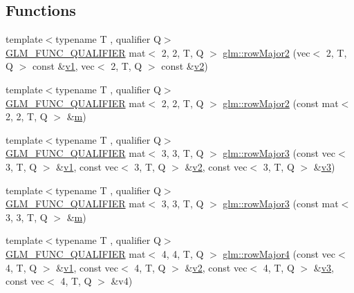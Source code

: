 \subsection*{Functions}
\begin{DoxyCompactItemize}
\item 
{\footnotesize template$<$typename T , qualifier Q$>$ }\\\hyperlink{setup_8hpp_a33fdea6f91c5f834105f7415e2a64407}{G\+L\+M\+\_\+\+F\+U\+N\+C\+\_\+\+Q\+U\+A\+L\+I\+F\+I\+ER} mat$<$ 2, 2, T, Q $>$ \hyperlink{group__gtx__matrix__major__storage_gaf5b1aee9e3eb1acf9d6c3c8be1e73bb8}{glm\+::row\+Major2} (vec$<$ 2, T, Q $>$ const \&\hyperlink{_s_d_l__opengl__glext_8h_a435c176a02c061b43e19bdf7c86cceae}{v1}, vec$<$ 2, T, Q $>$ const \&\hyperlink{_s_d_l__opengl__glext_8h_a0928f6d0f0f794ba000a21dfae422136}{v2})
\item 
{\footnotesize template$<$typename T , qualifier Q$>$ }\\\hyperlink{setup_8hpp_a33fdea6f91c5f834105f7415e2a64407}{G\+L\+M\+\_\+\+F\+U\+N\+C\+\_\+\+Q\+U\+A\+L\+I\+F\+I\+ER} mat$<$ 2, 2, T, Q $>$ \hyperlink{group__gtx__matrix__major__storage_gaf66c75ed69ca9e87462550708c2c6726}{glm\+::row\+Major2} (const mat$<$ 2, 2, T, Q $>$ \&\hyperlink{_s_d_l__opengl__glext_8h_af593500c283bf1a787a6f947f503a5c2}{m})
\item 
{\footnotesize template$<$typename T , qualifier Q$>$ }\\\hyperlink{setup_8hpp_a33fdea6f91c5f834105f7415e2a64407}{G\+L\+M\+\_\+\+F\+U\+N\+C\+\_\+\+Q\+U\+A\+L\+I\+F\+I\+ER} mat$<$ 3, 3, T, Q $>$ \hyperlink{group__gtx__matrix__major__storage_ga2ae46497493339f745754e40f438442e}{glm\+::row\+Major3} (const vec$<$ 3, T, Q $>$ \&\hyperlink{_s_d_l__opengl__glext_8h_a435c176a02c061b43e19bdf7c86cceae}{v1}, const vec$<$ 3, T, Q $>$ \&\hyperlink{_s_d_l__opengl__glext_8h_a0928f6d0f0f794ba000a21dfae422136}{v2}, const vec$<$ 3, T, Q $>$ \&\hyperlink{_s_d_l__opengl__glext_8h_acc806b31cbf466ceba6555983d8b814d}{v3})
\item 
{\footnotesize template$<$typename T , qualifier Q$>$ }\\\hyperlink{setup_8hpp_a33fdea6f91c5f834105f7415e2a64407}{G\+L\+M\+\_\+\+F\+U\+N\+C\+\_\+\+Q\+U\+A\+L\+I\+F\+I\+ER} mat$<$ 3, 3, T, Q $>$ \hyperlink{group__gtx__matrix__major__storage_gad8a3a50ab47bbe8d36cdb81d90dfcf77}{glm\+::row\+Major3} (const mat$<$ 3, 3, T, Q $>$ \&\hyperlink{_s_d_l__opengl__glext_8h_af593500c283bf1a787a6f947f503a5c2}{m})
\item 
{\footnotesize template$<$typename T , qualifier Q$>$ }\\\hyperlink{setup_8hpp_a33fdea6f91c5f834105f7415e2a64407}{G\+L\+M\+\_\+\+F\+U\+N\+C\+\_\+\+Q\+U\+A\+L\+I\+F\+I\+ER} mat$<$ 4, 4, T, Q $>$ \hyperlink{group__gtx__matrix__major__storage_ga9636cd6bbe2c32a8d0c03ffb8b1ef284}{glm\+::row\+Major4} (const vec$<$ 4, T, Q $>$ \&\hyperlink{_s_d_l__opengl__glext_8h_a435c176a02c061b43e19bdf7c86cceae}{v1}, const vec$<$ 4, T, Q $>$ \&\hyperlink{_s_d_l__opengl__glext_8h_a0928f6d0f0f794ba000a21dfae422136}{v2}, const vec$<$ 4, T, Q $>$ \&\hyperlink{_s_d_l__opengl__glext_8h_acc806b31cbf466ceba6555983d8b814d}{v3}, const vec$<$ 4, T, Q $>$ \&v4)

\end{DoxyCompactItemize}
